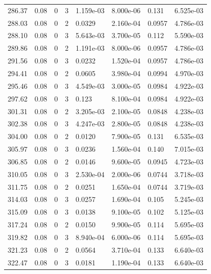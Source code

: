 \documentclass[preview]{standalone}
\begin{document}
{{{{{{\begin{tabular}{L{1.2cm}C{1.2cm} C{0.3cm}C{0.5cm} C{1.4cm}C{1.4cm} C{1.4cm}C{1.4cm}}
  286.37  &  0.08  & 0     &  3 &  1.159e-03  & 8.000e-06  & 0.131 &  6.525e-03   \\ 
  288.03  &  0.08  & 0     &  2 &  0.0329  & 2.160e-04  & 0.0957 &  4.786e-03   \\ 
  288.10  &  0.08  & 0     &  3 &  5.643e-03  & 3.700e-05  & 0.112 &  5.590e-03   \\ 
  289.86  &  0.08  & 0     &  2 &  1.191e-03  & 8.000e-06  & 0.0957 &  4.786e-03   \\ 
  291.56  &  0.08  & 0     &  3 &  0.0232  & 1.520e-04  & 0.0957 &  4.786e-03   \\ 
  294.41  &  0.08  & 0     &  2 &  0.0605  & 3.980e-04  & 0.0994 &  4.970e-03   \\ 
  295.46  &  0.08  & 0     &  3 &  4.549e-03  & 3.000e-05  & 0.0984 &  4.922e-03   \\ 
  297.62  &  0.08  & 0     &  3 &  0.123  & 8.100e-04  & 0.0984 &  4.922e-03   \\ 
  301.31  &  0.08  & 0     &  2 &  3.205e-03  & 2.100e-05  & 0.0848 &  4.238e-03   \\ 
  302.38  &  0.08  & 0     &  3 &  4.247e-03  & 2.800e-05  & 0.0848 &  4.238e-03   \\ 
  304.00  &  0.08  & 0     &  2 &  0.0120  & 7.900e-05  & 0.131 &  6.535e-03   \\ 
  305.97  &  0.08  & 0     &  3 &  0.0236  & 1.560e-04  & 0.140 &  7.015e-03   \\ 
  306.85  &  0.08  & 0     &  2 &  0.0146  & 9.600e-05  & 0.0945 &  4.723e-03   \\ 
  310.05  &  0.08  & 0     &  3 &  2.530e-04  & 2.000e-06  & 0.0744 &  3.718e-03   \\ 
  311.75  &  0.08  & 0     &  2 &  0.0251  & 1.650e-04  & 0.0744 &  3.719e-03   \\ 
  314.03  &  0.08  & 0     &  3 &  0.0257  & 1.690e-04  & 0.105 &  5.245e-03   \\ 
  315.09  &  0.08  & 0     &  3 &  0.0138  & 9.100e-05  & 0.102 &  5.125e-03   \\ 
  317.24  &  0.08  & 0     &  2 &  0.0150  & 9.900e-05  & 0.114 &  5.695e-03   \\ 
  319.82  &  0.08  & 0     &  3 &  8.940e-04  & 6.000e-06  & 0.114 &  5.695e-03   \\ 
  321.23  &  0.08  & 0     &  2 &  0.0564  & 3.710e-04  & 0.133 &  6.640e-03   \\ 
  322.47  &  0.08  & 0     &  3 &  0.0181  & 1.190e-04  & 0.133 &  6.640e-03   \\ 

\end{tabular}}}}}}}
\end{document}
